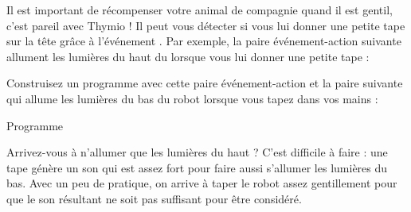 


Il est important de récompenser votre animal de compagnie quand il est gentil, c'est pareil avec Thymio !
Il peut vous détecter si vous lui donner une petite tape sur la tête grâce à l'événement .
Par exemple, la paire événement-action suivante allument les lumières du haut du lorsque vous lui donner une petite tape : 

Construisez un programme avec cette paire événement-action et la paire suivante qui allume les lumières du bas du robot lorsque vous tapez dans vos mains : 

{\raggedleft \hfill Programme }

Arrivez-vous à n'allumer que les lumières du haut ?
C'est difficile à faire : une tape génère un son qui est assez fort pour faire aussi s'allumer les lumières du bas.
Avec un peu de pratique, on arrive à taper le robot assez gentillement pour que le son résultant ne soit pas suffisant pour être considéré.

